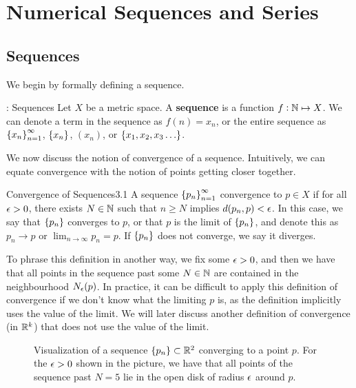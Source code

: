 \newpage
\section{Numerical Sequences and Series}
\subsection{Sequences}
We begin by formally defining a sequence.
\begin{ndef}{: Sequences}{}
    Let $X$ be a metric space. A \textbf{sequence} is a function $f: \mathbb{N} \mapsto X$. We can denote a term in the sequence as $f(n) = x_n$, or the entire sequence as $\set{x_n}_{n=1}^\infty$, $\set{x_n}$, $(x_n)$, or $\set{x_1, x_2, x_3 \ldots}$. 
\end{ndef}
\noindent We now discuss the notion of convergence of a sequence. Intuitively, we can equate convergence with the notion of points getting closer together.
\begin{definition}{Convergence of Sequences}{3.1}
    A sequence $\set{p_n}_{n=1}^\infty$ convergence to $p \in X$ if for all $\epsilon > 0$, there exists $N \in \mathbb{N}$ such that $n \geq N$ implies $d(p_n, p) < \epsilon$. In this case, we say that $\set{p_n}$ converges to $p$, or that $p$ is the limit of $\set{p_n}$, and denote this as $p_n \rightarrow p$ or $\lim_{n \rightarrow \infty} p_n = p$. If $\set{p_n}$ does not converge, we say it diverges.
\end{definition}
\noindent To phrase this definition in another way, we fix some $\epsilon > 0$, and then we have that all points in the sequence past some $N \in \mathbb{N}$ are contained in the neighbourhood $N_\epsilon(p)$. In practice, it can be difficult to apply this definition of convergence if we don't know what the limiting $p$ is, as the definition implicitly uses the value of the limit. We will later discuss another definition of convergence (in $\mathbb{R}^k$) that does not use the value of the limit.
\begin{figure}[htbp]
    \centering
    \caption{Visualization of a sequence $\set{p_n} \subset \mathbb{R}^2$ converging to a point $p$. For the $\epsilon > 0$ shown in the picture, we have that all points of the sequence past $N = 5$ lie in the open disk of radius $\epsilon$ around $p$.}
    \label{fig15}
\end{figure}

